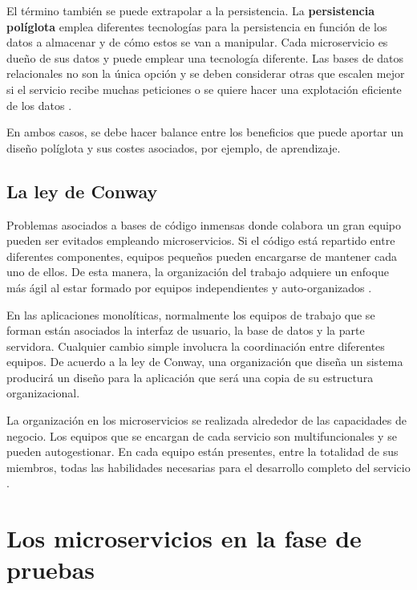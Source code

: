 \documentclass[11pt,spanish,listoffigures]{tfgetsinf}
\begin{document}
El término también se puede extrapolar a la persistencia. La \textbf{persistencia políglota} emplea diferentes tecnologías para la persistencia en función de los datos a almacenar y de cómo estos se van a manipular. Cada microservicio es dueño de sus datos y puede emplear una tecnología diferente. Las bases de datos relacionales no son la única opción y se deben considerar otras que escalen mejor si el servicio recibe muchas peticiones o se quiere hacer una explotación eficiente de los datos \cite{Fowler2011}.

En ambos casos, se debe hacer balance entre los beneficios que puede aportar un diseño políglota y sus costes asociados, por ejemplo, de aprendizaje.

\subsection{La ley de Conway}

Problemas asociados a bases de código inmensas donde colabora un gran equipo pueden ser evitados empleando microservicios. Si el código está repartido entre diferentes componentes, equipos pequeños pueden encargarse de mantener cada uno de ellos. De esta manera, la organización del trabajo adquiere un enfoque más ágil al estar formado por equipos independientes y auto-organizados \cite{Newman2015a}.

En las aplicaciones monolíticas, normalmente los equipos de trabajo que se forman están asociados la interfaz de usuario, la base de datos y la parte servidora. Cualquier cambio simple involucra la coordinación entre diferentes equipos. De acuerdo a la ley de Conway, una organización que diseña un sistema producirá un diseño para la aplicación que será una copia de su estructura organizacional.

La organización en los microservicios se realizada alrededor de las capacidades de negocio. Los equipos que se encargan de cada servicio son multifuncionales y se pueden autogestionar. En cada equipo están presentes, entre la totalidad de sus miembros, todas las habilidades necesarias para el desarrollo completo del servicio \cite{Lewis2014}.



\section{Los microservicios en la fase de pruebas} \label{sect:FasePruebas}
\end{document}
